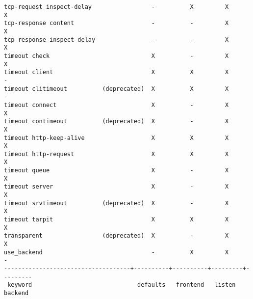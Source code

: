 \begin{verbatim}
tcp-request inspect-delay                 -          X         X         X
tcp-response content                      -          -         X         X
tcp-response inspect-delay                -          -         X         X
timeout check                             X          -         X         X
timeout client                            X          X         X         -
timeout clitimeout          (deprecated)  X          X         X         -
timeout connect                           X          -         X         X
timeout contimeout          (deprecated)  X          -         X         X
timeout http-keep-alive                   X          X         X         X
timeout http-request                      X          X         X         X
timeout queue                             X          -         X         X
timeout server                            X          -         X         X
timeout srvtimeout          (deprecated)  X          -         X         X
timeout tarpit                            X          X         X         X
transparent                 (deprecated)  X          -         X         X
use_backend                               -          X         X         -
------------------------------------+----------+----------+---------+---------
 keyword                              defaults   frontend   listen    backend
\end{verbatim}

